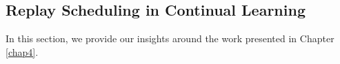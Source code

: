 

\subsection{Replay Scheduling in Continual Learning}

In this section, we provide our insights around the work presented in Chapter \ref{chap4}.

\vspace{-3mm}
